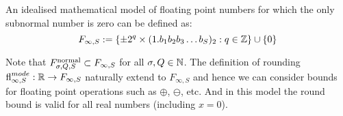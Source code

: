 \begin{definition} An idealised mathematical model of floating point numbers for which the only subnormal number is zero can be defined as:
\[
F_{\infty,S} := \{\pm 2^q \times (1.b_1b_2b_3\ldots b_S)_2 :  q \in {\mathbb Z} \} \cup \{0\}
\]
\end{definition}

Note that $F^{\rm normal}_{\ensuremath{\sigma},Q,S} \ensuremath{\subset} F_{\ensuremath{\infty},S}$ for all $\sigma,Q \in {\mathbb N}$. The definition of rounding ${\rm fl}_{\infty,S}^{mode} : {\mathbb R} \rightarrow F_{\infty,S}$ naturally extend to $F_{\ensuremath{\infty},S}$ and hence we can consider bounds for floating point operations such as $\ensuremath{\oplus}$, $\ensuremath{\ominus}$, etc. And in this model the round bound is valid for all real numbers (including $x = 0$).

